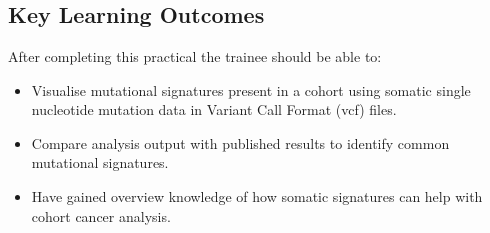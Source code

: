 



\chapter{\moduleTitle}


\newpage


\section{Key Learning Outcomes}

After completing this practical the trainee should be able to:

\begin{itemize}
 \item Visualise mutational signatures present in a cohort using somatic single nucleotide mutation data in Variant Call Format (vcf) files.
 \item Compare analysis output with published results to identify common mutational signatures.
 \item Have gained overview knowledge of how somatic signatures can help with cohort cancer analysis.
\end{itemize}


